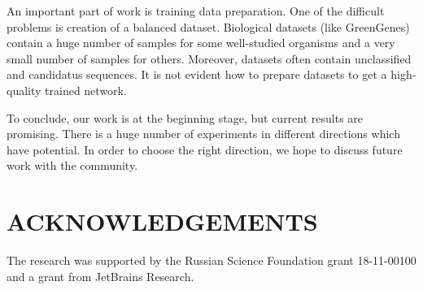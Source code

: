 \documentclass[a4paper,twoside]{article}
\begin{document}
An important part of work is training data preparation.
One of the difficult problems is creation of a balanced dataset.
Biological datasets (like GreenGenes) contain a huge number of samples for some well-studied organisms and a very small number of samples for others.
Moreover, datasets often contain unclassified and candidatus sequences.
It is not evident how to prepare datasets to get a high-quality trained network.

To conclude, our work is at the beginning stage, but current results are promising. 
There is a huge number of experiments in different directions which have potential.
In order to choose the right direction, we hope to discuss future work with the community.


\section*{\uppercase{Acknowledgements}}

\noindent The research was supported by the Russian Science Foundation grant 18-11-00100 and a grant from JetBrains Research.




{\small
}


\vfill
\end{document}
